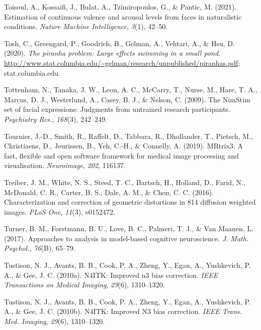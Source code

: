\documentclass[11pt,american,a4paper,oneside,]{memoir} %
\begin{document}
\leavevmode\hypertarget{ref-Toisoul2021-yc}{}%
Toisoul, A., Kossaifi, J., Bulat, A., Tzimiropoulos, G., \& Pantic, M. (2021). Estimation of continuous valence and arousal levels from faces in naturalistic conditions. \emph{Nature Machine Intelligence}, \emph{3}(1), 42--50.

\leavevmode\hypertarget{ref-Tosh2020-sf}{}%
Tosh, C., Greengard, P., Goodrich, B., Gelman, A., Vehtari, A., \& Hsu, D. (2020). \emph{The piranha problem: Large effects swimming in a small pond}. \url{http://www.stat.columbia.edu/~gelman/research/unpublished/piranhas.pdf}; stat.columbia.edu.

\leavevmode\hypertarget{ref-Tottenham2009-vn}{}%
Tottenham, N., Tanaka, J. W., Leon, A. C., McCarry, T., Nurse, M., Hare, T. A., Marcus, D. J., Westerlund, A., Casey, B. J., \& Nelson, C. (2009). The NimStim set of facial expressions: Judgments from untrained research participants. \emph{Psychiatry Res.}, \emph{168}(3), 242--249.

\leavevmode\hypertarget{ref-Tournier2019-hh}{}%
Tournier, J.-D., Smith, R., Raffelt, D., Tabbara, R., Dhollander, T., Pietsch, M., Christiaens, D., Jeurissen, B., Yeh, C.-H., \& Connelly, A. (2019). MRtrix3: A fast, flexible and open software framework for medical image processing and visualisation. \emph{Neuroimage}, \emph{202}, 116137.

\leavevmode\hypertarget{ref-Treiber2016-mc}{}%
Treiber, J. M., White, N. S., Steed, T. C., Bartsch, H., Holland, D., Farid, N., McDonald, C. R., Carter, B. S., Dale, A. M., \& Chen, C. C. (2016). Characterization and correction of geometric distortions in 814 diffusion weighted images. \emph{PLoS One}, \emph{11}(3), e0152472.

\leavevmode\hypertarget{ref-Turner2017-fi}{}%
Turner, B. M., Forstmann, B. U., Love, B. C., Palmeri, T. J., \& Van Maanen, L. (2017). Approaches to analysis in model-based cognitive neuroscience. \emph{J. Math. Psychol.}, \emph{76}(B), 65--79.

\leavevmode\hypertarget{ref-tustison2010n4itk}{}%
Tustison, N. J., Avants, B. B., Cook, P. A., Zheng, Y., Egan, A., Yushkevich, P. A., \& Gee, J. C. (2010a). N4ITK: Improved n3 bias correction. \emph{IEEE Transactions on Medical Imaging}, \emph{29}(6), 1310--1320.

\leavevmode\hypertarget{ref-Tustison2010-tk}{}%
Tustison, N. J., Avants, B. B., Cook, P. A., Zheng, Y., Egan, A., Yushkevich, P. A., \& Gee, J. C. (2010b). N4ITK: Improved N3 bias correction. \emph{IEEE Trans. Med. Imaging}, \emph{29}(6), 1310--1320.
\end{document}
